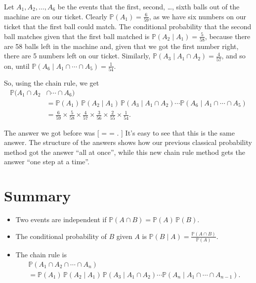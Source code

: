 \documentclass[
  letterpaper,
  DIV=11,
  numbers=noendperiod]{scrreprt}
\providecommand{\tightlist}{%
  \setlength{\itemsep}{0pt}\setlength{\parskip}{0pt}}\usepackage{longtable,booktabs,array}
\theoremstyle{remark}
\begin{document}
Let \(A_1, A_2, \dots, A_6\) be the events that the first, second,
\ldots, sixth balls out of the machine are on our ticket. Clearly
\(\mathbb P(A_1) = \frac{6}{59}\), as we have six numbers on our ticket
that the first ball could match. The conditional probability that the
second ball matches given that the first ball matched is
\(\mathbb P(A_2 \mid A_1) = \frac{5}{58}\), because there are 58 balls
left in the machine and, given that we got the first number right, there
are 5 numbers left on our ticket. Similarly,
\(\mathbb P(A_3 \mid A_1 \cap A_2) = \frac{4}{57}\), and so on, until
\(\mathbb P(A_6 \mid A_1 \cap \cdots\cap A_5) = \frac{1}{54}\).

So, using the chain rule, we get \begin{align*}
\mathbb P(A_1 \cap A_2 &\cap \cdots \cap A_6) \\
&= \mathbb P(A_1) \, \mathbb P(A_2 \mid A_1) \, \mathbb P(A_3 \mid A_1 \cap A_2) \cdots \mathbb P(A_6 \mid A_1 \cap \cdots \cap A_5) \\
&= \frac{6}{59} \times \frac{5}{58} \times \frac{4}{57} \times \frac{3}{56} \times \frac{2}{55} \times \frac{1}{54} .
\end{align*}

The answer we got before was {[}  =
=  . {]} It's easy to see that this is the
same answer. The structure of the answers shows how our previous
classical probability method got the answer ``all at once'', while this
new chain rule method gets the answer ``one step at a time''.

\hypertarget{summary-L07}{%
\section*{Summary}\label{summary-L07}}


\begin{itemize}
\tightlist
\item
  Two events are independent if
  \(\mathbb P(A \cap B) = \mathbb P(A)\, \mathbb P(B)\).
\item
  The conditional probability of \(B\) given \(A\) is
  \({\displaystyle \mathbb P(B \mid A) = \frac{\mathbb P(A \cap B)}{\mathbb P(A)}}\).
\item
  The chain rule is \begin{multline*}
  \mathbb P(A_1 \cap A_2 \cap \cdots \cap A_n) \\
  = \mathbb P(A_1) \, \mathbb P(A_2 \mid A_1) \, \mathbb P(A_3 \mid A_1 \cap A_2) \cdots \mathbb P(A_n \mid A_1 \cap \cdots \cap  A_{n-1}) . 
  \end{multline*}
\end{itemize}
\end{document}
